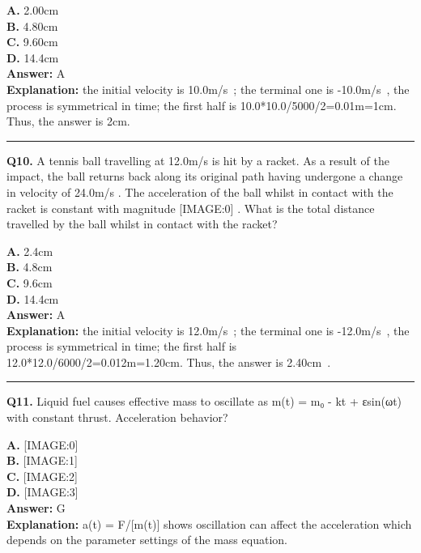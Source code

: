 \documentclass[12pt]{article}
\begin{document}
\textbf{A.} 2.00cm \\
\textbf{B.} 4.80cm \\
\textbf{C.} 9.60cm \\
\textbf{D.} 14.4cm \\

\textbf{Answer:} A \\
\textbf{Explanation:} the initial velocity is 10.0m/s ; the terminal one is -10.0m/s , the process is symmetrical in time; the first half is 10.0*10.0/5000/2=0.01m=1cm. Thus, the answer is 2cm.

\hrule
\vspace{1em}


\noindent
\textbf{Q10.} A tennis ball travelling at 12.0m/s
is hit by a racket. As a result of the impact, the ball returns back along its original path having undergone a change in velocity of 24.0m/s
. The acceleration of the ball whilst in contact with the racket is constant with magnitude
[IMAGE:0]
.
What is the total distance travelled by the ball whilst in contact with the racket?



\textbf{A.} 2.4cm \\
\textbf{B.} 4.8cm \\
\textbf{C.} 9.6cm \\
\textbf{D.} 14.4cm \\

\textbf{Answer:} A \\
\textbf{Explanation:} the initial velocity is 12.0m/s ; the terminal one is -12.0m/s , the process is symmetrical in time; the first half is 12.0*12.0/6000/2=0.012m=1.20cm. Thus, the answer is 2.40cm .

\hrule
\vspace{1em}


\noindent
\textbf{Q11.} Liquid fuel causes effective mass to oscillate as m(t) = m₀ - kt + εsin(ωt) with constant thrust.
Acceleration behavior?



\textbf{A.} [IMAGE:0] \\
\textbf{B.} [IMAGE:1] \\
\textbf{C.} [IMAGE:2] \\
\textbf{D.} [IMAGE:3] \\

\textbf{Answer:} G \\
\textbf{Explanation:} a(t) = F/[m(t)] shows oscillation can affect the acceleration which depends on the parameter settings of the mass equation.
\end{document}
